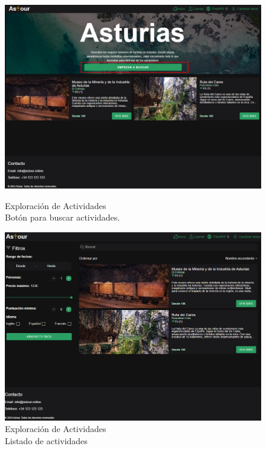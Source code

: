 \begin{figure}[H]
	\centering
	\begin{minipage}{0.45\textwidth}
		\centering
		\includegraphics[width=1\textwidth]{7-Construccion/Manuales/web/inicio buscar.png}
		\caption{Exploración de Actividades \\ Botón para buscar actividades.}
		\label{fig:inicio-buscar}
	\end{minipage}
	\hfill
	\begin{minipage}{0.45\textwidth}
		\centering
		\includegraphics[width=1\textwidth]{7-Construccion/Manuales/web/buscar actividades.png}
		\caption{Exploración de Actividades \\ Listado de actividades}
		\label{fig:buscar-actividades}
	\end{minipage}
\end{figure}


